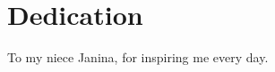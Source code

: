 %
%

\pagebreak
\thispagestyle{empty} %

\section*{Dedication}

To my niece Janina, for inspiring me every day. 
